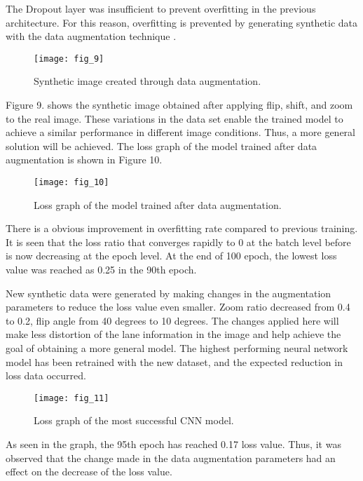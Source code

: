 \documentclass[twocolumn, switch]{article} %
\begin{document}
The Dropout layer was insufficient to prevent overfitting in
the previous architecture. For this reason, overfitting is
prevented by generating synthetic data with the data
augmentation technique \cite{takahashi2019data}.

\begin{figure}[h]
    \centering
    \texttt{[image: fig\_9]}
    \caption{Synthetic image created through data augmentation.}
    \label{fig:fig9}
\end{figure}

Figure 9. shows the synthetic image obtained after applying
flip, shift, and zoom to the real image. These variations in
the data set enable the trained model to achieve a similar
performance in different image conditions. Thus, a more
general solution will be achieved. The loss graph of the
model trained after data augmentation is shown in Figure 10.

\begin{figure}[h]
    \centering
    \texttt{[image: fig\_10]}
    \caption{Loss graph of the model trained after data
augmentation.}
    \label{fig:fig10}
\end{figure}



There is a obvious improvement in overfitting \cite{hawkins2004problem} rate
compared to previous training. It is seen that the loss ratio
that converges rapidly to 0 at the batch level before is now
decreasing at the epoch level. At the end of 100 epoch, the
lowest loss value was reached as 0.25 in the 90th epoch.

New synthetic data were generated by making changes in the
augmentation parameters to reduce the loss value even
smaller. Zoom ratio decreased from 0.4 to 0.2, flip angle
from 40 degrees to 10 degrees. The changes applied here will
make less distortion of the lane information in the image and
help achieve the goal of obtaining a more general model. The
highest performing neural network model has been retrained
with the new dataset, and the expected reduction in loss data
occurred.

\begin{figure}[h]
    \centering
    \texttt{[image: fig\_11]}
    \caption{Loss graph of the most successful CNN model.}
    \label{fig:fig11}
\end{figure}

As seen in the graph, the 95th epoch has reached 0.17 loss
value. Thus, it was observed that the change made in the data
augmentation parameters had an effect on the decrease of the
loss value.
\end{document}
